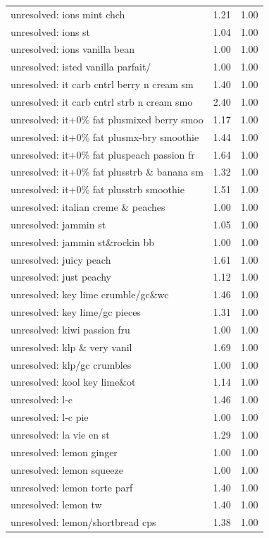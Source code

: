 \begin{table}
\begin{tabular}{lrr}
unresolved: ions mint chch & 1.21 & 1.00 \\
unresolved: ions st & 1.04 & 1.00 \\
unresolved: ions vanilla bean & 1.00 & 1.00 \\
unresolved: isted vanilla parfait/ & 1.00 & 1.00 \\
unresolved: it carb cntrl berry n cream sm & 1.40 & 1.00 \\
unresolved: it carb cntrl strb n cream smo & 2.40 & 1.00 \\
unresolved: it+0\% fat plusmixed berry smoo & 1.17 & 1.00 \\
unresolved: it+0\% fat plusmx-bry smoothie & 1.44 & 1.00 \\
unresolved: it+0\% fat pluspeach passion fr & 1.64 & 1.00 \\
unresolved: it+0\% fat plusstrb \& banana sm & 1.32 & 1.00 \\
unresolved: it+0\% fat plusstrb smoothie & 1.51 & 1.00 \\
unresolved: italian creme \& peaches & 1.00 & 1.00 \\
unresolved: jammin st & 1.05 & 1.00 \\
unresolved: jammin st\&rockin bb & 1.00 & 1.00 \\
unresolved: juicy peach & 1.61 & 1.00 \\
unresolved: just peachy & 1.12 & 1.00 \\
unresolved: key lime crumble/gc\&wc & 1.46 & 1.00 \\
unresolved: key lime/gc pieces & 1.31 & 1.00 \\
unresolved: kiwi passion fru & 1.00 & 1.00 \\
unresolved: klp \& very vanil & 1.69 & 1.00 \\
unresolved: klp/gc crumbles & 1.00 & 1.00 \\
unresolved: kool key lime\&ot & 1.14 & 1.00 \\
unresolved: l-c & 1.46 & 1.00 \\
unresolved: l-c pie & 1.00 & 1.00 \\
unresolved: la vie en st & 1.29 & 1.00 \\
unresolved: lemon ginger & 1.00 & 1.00 \\
unresolved: lemon squeeze & 1.00 & 1.00 \\
unresolved: lemon torte parf & 1.40 & 1.00 \\
unresolved: lemon tw & 1.40 & 1.00 \\
unresolved: lemon/shortbread cps & 1.38 & 1.00 \\

\end{tabular}
\end{table}
